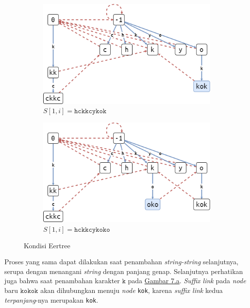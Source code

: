 \documentclass[11pt, a4paper, final]{article}
\begin{document}
\begin{figure}[H]
\centering
\begin{subfigure}[b]{0.45\textwidth}
\includegraphics[scale=0.45]{assets/eer07.png}
\caption{$S[1, i] = \texttt{hckkcykok}$}
\end{subfigure}
\begin{subfigure}[b]{0.45\textwidth}
\includegraphics[scale=0.4]{assets/eer08.png}
\caption{$S[1, i] = \texttt{hckkcykoko}$}
\end{subfigure}
\caption{Kondisi Eertree}
\end{figure}

Proses yang sama dapat dilakukan saat penambahan \textit{string-string} selanjutnya, serupa dengan menangani \textit{string} dengan panjang genap. Selanjutnya perhatikan juga bahwa saat penambahan karakter $\texttt{k}$ pada \hyperref[eer9]{Gambar 7.a}. \textit{Suffix link} pada \textit{node} baru $\texttt{kokok}$ akan dihubungkan menuju \textit{node} \texttt{kok}, karena \textit{suffix link} kedua \textit{terpanjang}-nya merupakan \texttt{kok}.
\end{document}
